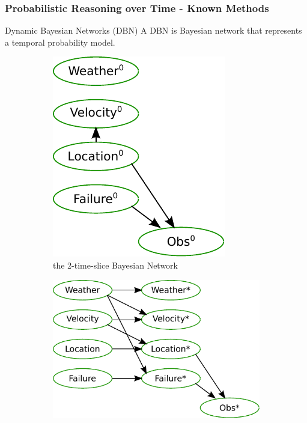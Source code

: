 \begin{frame}[t]
    \frametitle{Probabilistic Reasoning over Time - Known Methods}
    
  	\begin{block}{Dynamic Bayesian Networks (DBN)}
  		A DBN is Bayesian network that represents a temporal probability model.
  	\end{block}
  	
  	\begin{figure}
  		\centering
  		
		\begin{subfigure}[b]{0.18\textwidth}
			\centering
  			\includegraphics[width=\textwidth]{dbn-vehicle/zero.pdf}
  			\caption{\tiny{the 2-time-slice Bayesian Network}}
  			\label{fig:2TBN}
  		\end{subfigure}
  		\begin{subfigure}[b]{0.33\textwidth}
			\centering
			\includegraphics[width=\textwidth]{dbn-vehicle/transition.pdf}

\end{subfigure}
\end{figure}
\end{frame}
